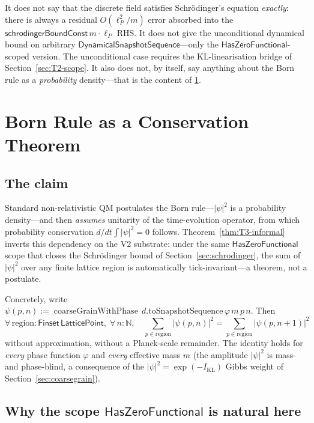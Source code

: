 \documentclass[11pt,a4paper,twoside]{article}
\theoremstyle{definition}
\newcommand{\KL}{I_{\mathrm{KL}}}
\newcommand{\Nbb}{\mathbb{N}}
\newcommand{\lP}{\ell_P}
\newcommand{\coarseGrainWithPhase}{\operatorname{coarseGrainWithPhase}}
\newcommand{\HasZF}{\mathsf{HasZeroFunctional}}
\newcommand{\DynSeq}{\mathsf{DynamicalSnapshotSequence}}
\begin{document}
It does not say that the discrete field satisfies Schr\"odinger's
equation \emph{exactly}: there is always a residual $O(\lP^{2}/m)$
error absorbed into the $\mathsf{schrodingerBoundConst}\,m\cdot\lP$
RHS. It does not give the unconditional dynamical bound on arbitrary
$\DynSeq$---only the $\HasZF$-scoped version. The unconditional case
requires the KL-linearisation bridge of Section~\ref{sec:T2-scope}.
It also does not, by itself, say anything about the Born rule as a
\emph{probability} density---that is the content of
\cref{sec:born}.

\section{Born Rule as a Conservation Theorem}\label{sec:born}

\subsection{The claim}\label{sec:born-claim}

Standard non-relativistic QM postulates the Born rule---$|\psi|^{2}$
is a probability density---and then \emph{assumes} unitarity of the
time-evolution operator, from which probability conservation
$d/dt\int|\psi|^{2}=0$ follows. Theorem~\ref{thm:T3-informal} inverts
this dependency on the V2 substrate: under the same $\HasZF$ scope
that closes the Schr\"odinger bound of Section~\ref{sec:schrodinger},
the sum of $|\psi|^{2}$ over any finite lattice region is
automatically tick-invariant---a theorem, not a postulate.

Concretely, write
$\psi(p,n):=\coarseGrainWithPhase\,d.\mathrm{toSnapshotSequence}\,\varphi\,m\,p\,n$.
Then
\[
\forall\,\mathrm{region}:\mathsf{Finset}\,\mathsf{LatticePoint},\;
\forall\,n:\Nbb,\quad
\sum_{p\in\mathrm{region}}|\psi(p,n)|^{2}
 =\sum_{p\in\mathrm{region}}|\psi(p,n{+}1)|^{2}
\]
without approximation, without a Planck-scale remainder. The identity
holds for \emph{every} phase function $\varphi$ and \emph{every}
effective mass $m$ (the amplitude $|\psi|^{2}$ is mass- and
phase-blind, a consequence of the $|\psi|^{2}=\exp(-\KL)$ Gibbs
weight of Section~\ref{sec:coarsegrain}).

\subsection{Why the scope \texorpdfstring{$\HasZF$}{HasZeroFunctional}
is natural here}\label{sec:born-scope}
\end{document}
